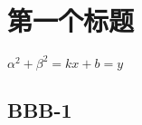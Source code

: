 \documentclass[hyper, lang=cn]{ztex}
\begin{document}
\section{第一个标题}
\zhlipsum[1] $\alpha^2 + \beta^2 = kx + b = y$ 

\zhlipsum[1]


\subsection{BBB-1}
\zhlipsum[1]
\end{document}

